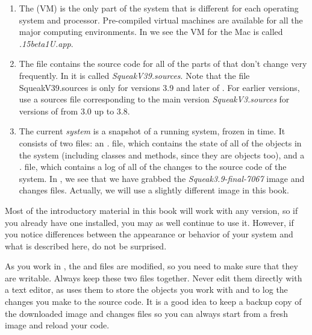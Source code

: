 \documentclass[a4paper,10pt,twoside]{book}
\begin{document}
\begin{enumerate}

  \item The  (VM) is the only part of the system that is different for each operating system and processor.  Pre-compiled virtual machines are available for all the major computing environments.  In  we see the VM for the Mac is called \textit{.15beta1U.app}.

  \item The  file contains the source code for all of the parts of \sq that don't change very frequently. In  it is called \emph{SqueakV39.sources}. Note that the file SqueakV39.sources is only for versions 3.9 and later of \sq. For earlier versions, use a sources file corresponding to the main version \eg \textit{SqueakV3.sources} for versions of \sq from 3.0 up to 3.8.

  \item The current \emph{system } is a snapshot of a running \sq system, frozen in time.  It consists of two files: an \emph{.} file, which contains the state of all of the objects in the system (including classes and methods, since they are objects too), and a \emph{.} file, which contains a log of all of the changes to the source code of the system.
In , we see that we have grabbed the \textit{Squeak3.9-final-7067} image and changes files.
Actually, we will use a slightly different image in this book.
\end{enumerate}

\label{sec:sbeImage}

Most of the introductory material in this book will work with any version, so if you already have one installed, you may as well continue to use it.
However, if you notice differences between the appearance or behavior of your system and what is described here, do not be surprised.

As you work in \sq, the  and  files are modified, so you need to make sure that they are writable.
Always keep these two files together.
Never edit them directly with a text editor, as \sq uses them to store the objects you work with and to log the changes you make to the source code.
It is a good idea to keep a backup copy of the downloaded image and changes files so you can always start from a fresh image and reload your code.
\end{document}
